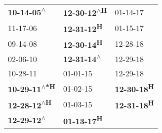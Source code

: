 \begin{supertabular}{lll}
   \textbf{10-14-05\textsuperscript{$\wedge$}} &  \textbf{12-30-12\textsuperscript{$\wedge$H}} &            01-14-17\textsuperscript{} \\
                    11-17-06\textsuperscript{} &          \textbf{12-31-12\textsuperscript{H}} &            01-15-17\textsuperscript{} \\
                    09-14-08\textsuperscript{} &          \textbf{12-30-14\textsuperscript{H}} &            12-28-18\textsuperscript{} \\
                    02-06-10\textsuperscript{} &   \textbf{12-31-14\textsuperscript{$\wedge$}} &            12-29-18\textsuperscript{} \\
                    10-28-11\textsuperscript{} &                    01-01-15\textsuperscript{} &            12-29-18\textsuperscript{} \\
 \textbf{10-29-11\textsuperscript{$\wedge$*H}} &                    01-02-15\textsuperscript{} &  \textbf{12-30-18\textsuperscript{H}} \\
  \textbf{12-28-12\textsuperscript{$\wedge$H}} &                    01-03-15\textsuperscript{} &  \textbf{12-31-18\textsuperscript{H}} \\
   \textbf{12-29-12\textsuperscript{$\wedge$}} &          \textbf{01-13-17\textsuperscript{H}} &                                       \\
\end{supertabular}
